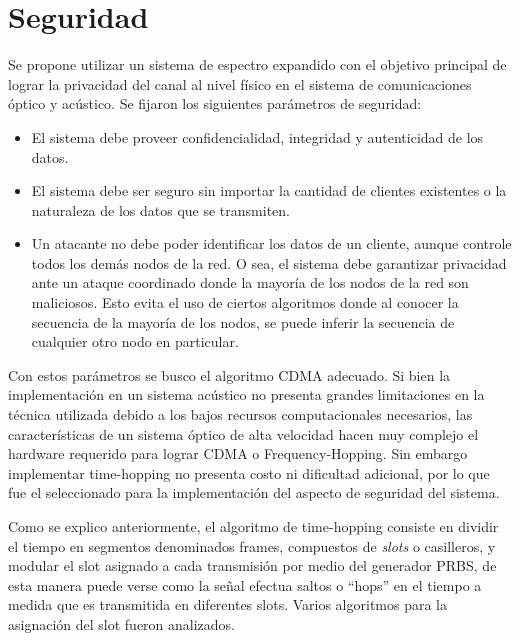 \section{Seguridad}
\label{Seguridad}

Se propone utilizar un sistema de espectro expandido con el objetivo principal de lograr la privacidad del canal al nivel físico en el sistema de comunicaciones óptico y acústico.
Se fijaron los siguientes parámetros de seguridad:

\begin{itemize}
 \item El sistema debe proveer confidencialidad, integridad y autenticidad de los datos.
 \item El sistema debe ser seguro sin importar la cantidad de clientes existentes o la naturaleza de los datos que se transmiten.
 \item Un atacante no debe poder identificar los datos de un cliente, aunque controle todos los demás nodos de la red. O sea, el sistema debe garantizar privacidad ante un ataque coordinado donde la mayoría de los nodos de la red son maliciosos. Esto evita el uso de ciertos algoritmos \cite{gold1967optimal} donde al conocer la secuencia de la mayoría de los nodos, se puede inferir la secuencia de cualquier otro nodo en particular.
\end{itemize}

Con estos parámetros se busco el algoritmo CDMA adecuado. Si bien la implementación en un sistema acústico no presenta grandes limitaciones en la técnica utilizada debido a los bajos recursos computacionales necesarios, las características de un sistema óptico de alta velocidad hacen muy complejo el hardware requerido para lograr CDMA o Frequency-Hopping. Sin embargo implementar time-hopping no presenta costo ni dificultad adicional, por lo que fue el seleccionado para la implementación del aspecto de seguridad del sistema.

Como se explico anteriormente, el algoritmo de time-hopping consiste en dividir el tiempo en segmentos denominados frames, compuestos de \textit{slots} o casilleros, y modular el slot asignado a cada transmisión por medio del generador PRBS, de esta manera puede verse como la señal efectua saltos o ``hops'' en el tiempo a medida que es transmitida en diferentes slots. Varios algoritmos para la asignación del slot fueron analizados. 

